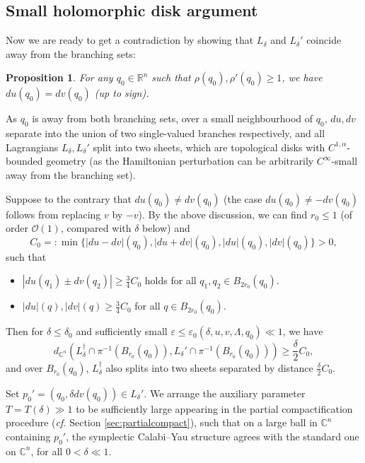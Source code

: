 \documentclass[11pt,a4paper]{article}
\numberwithin{equation}{section}%
\newtheorem{prop}[thm]{Proposition}
\theoremstyle{definition}
\newcommand{\cf}{\emph{cf.} }
\newcommand{\R}{\mathbb{R}}
\newcommand{\C}{\mathbb{C}}
\begin{document}
\subsection{Small holomorphic disk argument}
    Now we are ready to get a contradiction by showing that $L_\delta$ and $L_\delta'$ coincide away from the branching sets: 

    \begin{prop}\label{prop:uvagreeatq0}
        For any $q_0\in \R^n$ such that $\rho(q_0),\rho'(q_0)\geqslant 1$, we have $du(q_0)=dv(q_0)$ (up to sign).  
    \end{prop}
    
     As $q_0$ is away from both branching sets, over a small neighbourhood of $q_0$, $du,dv$ separate into the union of two single-valued branches respectively, and 
    all Lagrangians $L_\delta,L_\delta'$ split into two sheets, which are topological disks with $C^{1,\alpha}$-bounded geometry (as the Hamiltonian perturbation can be arbitrarily $C^\infty$-small away from the branching set). 

    Suppose to the contrary that $du(q_0)\neq dv(q_0)$ (the case $du(q_0)\neq -dv(q_0)$ follows from replacing $v$ by $-v$). By the above discussion, we can find $r_0\leqslant 1$ (of order $\mathcal{O}(1)$, compared with $\delta$ below) and 
    $$C_0=:\min \{|du-dv|(q_0),|du+dv|(q_0),|du|(q_0),|dv|(q_0)\}>0,$$
    such that 
    \begin{itemize}
        \item $|du(q_1)\pm dv(q_2)|\geqslant \frac{3}{4}C_0$ holds for all $q_1,q_2\in B_{2r_0}(q_0)$. 
        \item $|du|(q),|dv|(q)\geqslant \frac{3}{4}C_0$ for all $q\in B_{2r_0}(q_0)$.  
    \end{itemize}Then for $\delta \leqslant \delta_0$ and sufficiently small $\varepsilon\leqslant \varepsilon_0(\delta,u,v,\Lambda,q_0)\ll1$, we have
    \begin{equation}
        \label{eqn:distanceoftwolagsnearq0}
        d_{\C^n}(L_\delta^\dagger\cap \pi^{-1}(B_{r_0}(q_0)),L_\delta'\cap \pi^{-1}(B_{r_0}(q_0)))\geqslant \frac{\delta}{2}C_0,
    \end{equation}
    and over $B_{r_0}(q_0)$, $L_\delta^{\dagger}$ also splits into two sheets separated by distance $\frac{\delta}{2}C_0$.  
    
     Set $p_0'=(q_0,\delta dv(q_0))\in L_{\delta}'$. We arrange the auxiliary parameter $T=T(\delta)\gg 1$ to be sufficiently large appearing in the partial compactification procedure (\cf Section \ref{sec:partialcompact}), such that on a large ball in $\C^n$ containing $p_0'$, the symplectic Calabi--Yau structure agrees with the standard one on $\C^n$, for all $ 0<\delta\ll 1$.  
    
\end{document}
